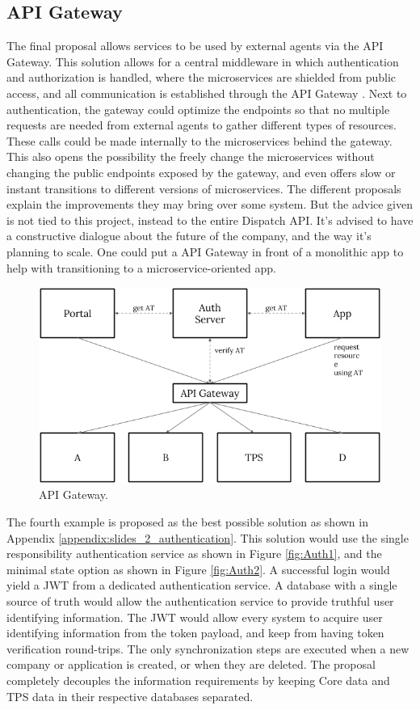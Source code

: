 \subsection{API Gateway}
The final proposal allows services to be used by external agents via the API Gateway. This solution allows for a central middleware in which authentication and authorization is handled, where the microservices are shielded from public access, and all communication is established through the API Gateway \cite{api-gateway}. Next to authentication, the gateway could optimize the endpoints so that no multiple requests are needed from external agents to gather different types of resources. These calls could be made internally to the microservices behind the gateway. This also opens the possibility the freely change the microservices without changing the public endpoints exposed by the gateway, and even offers slow or instant transitions to different versions of microservices. The different proposals explain the improvements they may bring over some system. But the advice given is not tied to this project, instead to the entire Dispatch API. It’s advised to have a constructive dialogue about the future of the company, and the way it’s planning to scale. One could put a API Gateway in front of a monolithic app to help with transitioning to a microservice-oriented app.

\begin{figure}[H]
	\centering
	\includegraphics[width=.7\textwidth]{Auth3}
	\caption[API Gateway]{API Gateway.}
	\label{fig:Auth3}
\end{figure}

The fourth example is proposed as the best possible solution as shown in Appendix \ref{appendix:slides_2_authentication}. This solution would use the single responsibility authentication service as shown in Figure \ref{fig:Auth1}, and the minimal state option as shown in Figure \ref{fig:Auth2}. A successful login would yield a JWT from a dedicated authentication service. A database with a single source of truth would allow the authentication service to provide truthful user identifying information. The JWT would allow every system to acquire user identifying information from the token payload, and keep from having token verification round-trips. The only synchronization steps are executed when a new company or application is created, or when they are deleted. The proposal completely decouples the information requirements by keeping Core data and TPS data in their respective databases separated.

